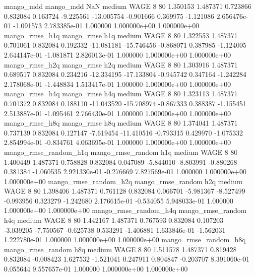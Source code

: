             mango_mdd         mango_mdd                  NaN     medium     WAGE                 8 80  1.350153       1.487371 0.723866       0.832084    0.163724     -9.225561    -13.005754    -0.901666       0.369975 -1.121086 2.656476e-01    -1.091573   2.783385e-01            1.000000    1.000000e+00        1.000000e+00
       mango_rmse_h1q        mango_rmse                  h1q     medium     WAGE                 8 80  1.322553       1.487371 0.701061       0.832084    0.192332    -11.081181    -15.746456    -0.868071       0.387985 -1.124005 2.644147e-01    -1.081871   2.826013e-01            1.000000    1.000000e+00        1.000000e+00
       mango_rmse_h2q        mango_rmse                  h2q     medium     WAGE                 8 80  1.303916       1.487371 0.689517       0.832084    0.234216    -12.334195    -17.133804    -0.945742       0.347164 -1.242284 2.178068e-01    -1.448834   1.513417e-01            1.000000    1.000000e+00        1.000000e+00
       mango_rmse_h4q        mango_rmse                  h4q     medium     WAGE                 8 80  1.323113       1.487371 0.701372       0.832084    0.188110    -11.043520    -15.708974    -0.867333       0.388387 -1.155451 2.513887e-01    -1.095461   2.766430e-01            1.000000    1.000000e+00        1.000000e+00
       mango_rmse_h8q        mango_rmse                  h8q     medium     WAGE                 8 80  1.374041       1.487371 0.737139       0.832084    0.127147     -7.619454    -11.410516    -0.793315       0.429970 -1.075332 2.854994e-01    -0.834761   4.063695e-01            1.000000    1.000000e+00        1.000000e+00
mango_rmse_random_h1q mango_rmse_random                  h1q     medium     WAGE                 8 80  1.400449       1.487371 0.758828       0.832084    0.047089     -5.844010     -8.803991    -0.880268       0.381384 -1.060535 2.921330e-01    -0.276669   7.827569e-01            1.000000    1.000000e+00        1.000000e+00
mango_rmse_random_h2q mango_rmse_random                  h2q     medium     WAGE                 8 80  1.398406       1.487371 0.761128       0.832084    0.066701     -5.981367     -8.527499    -0.993956       0.323279 -1.242680 2.176615e-01    -0.534055   5.948033e-01            1.000000    1.000000e+00        1.000000e+00
mango_rmse_random_h4q mango_rmse_random                  h4q     medium     WAGE                 8 80  1.442167       1.487371 0.767593       0.832084    0.107203     -3.039205     -7.750567    -0.625738       0.533291 -1.406881 1.633846e-01    -1.562031   1.222780e-01            1.000000    1.000000e+00        1.000000e+00
mango_rmse_random_h8q mango_rmse_random                  h8q     medium     WAGE                 8 80  1.511578       1.487371 0.819428       0.832084   -0.008423      1.627532     -1.521041     0.247911       0.804847 -0.203707 8.391060e-01     0.055644   9.557657e-01            1.000000    1.000000e+00        1.000000e+00